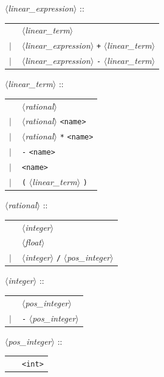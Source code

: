 \documentclass[a4paper,11pt]{report}
\newcommand{\nt}[1]{$\langle$\emph{#1}$\rangle$}
\newcommand{\regleGrammaire}[1]{\bigskip \noindent \nt{#1} :: \\}
\newcommand{\styleIMI}[1]{\textcolor{imicolor}{\texttt{#1}}}
\begin{document}
\regleGrammaire{linear\_expression}
\begin{tabular}{l l}
	\  & \nt{linear\_term} \\
	$|$ & \nt{linear\_expression} \styleIMI{+} \nt{linear\_term} \\
	$|$ & \nt{linear\_expression} \styleIMI{-} \nt{linear\_term} \\
\end{tabular}

\regleGrammaire{linear\_term}
\begin{tabular}{l l}
	\  & \nt{rational} \\
	$|$ & \nt{rational} \styleIMI{<name>} \\
	$|$ & \nt{rational} \styleIMI{*} \styleIMI{<name>} \\
	$|$ & \styleIMI{-} \styleIMI{<name>} \\
	$|$ & \styleIMI{<name>} \\
	$|$ & \styleIMI{(} \nt{linear\_term} \styleIMI{)} \\
\end{tabular}

\regleGrammaire{rational}
\begin{tabular}{l l}
	\  & \nt{integer} \\
	\  & \nt{float} \\
	$|$ & \nt{integer} \styleIMI{/} \nt{pos\_integer}  \\
\end{tabular}

\regleGrammaire{integer}
\begin{tabular}{l l}
	\  & \nt{pos\_integer} \\
	$|$ & \styleIMI{-} \nt{pos\_integer}  \\
\end{tabular}

\regleGrammaire{pos\_integer}
\begin{tabular}{l l}
	\  & \styleIMI{<int>} \\
\end{tabular}
\end{document}
